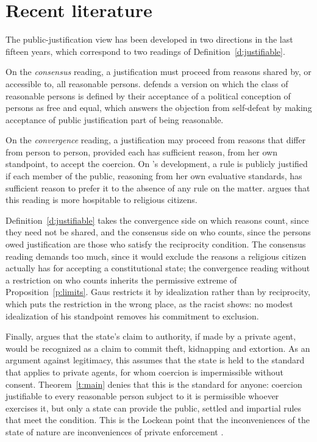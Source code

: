\documentclass{situationist-preprint}
\begin{document}
\section{Recent literature}

The public-justification view has been developed in two directions in the last fifteen years, which correspond to two readings of Definition~\ref{d:justifiable}.

On the \emph{consensus} reading, a justification must proceed from reasons shared by, or accessible to, all reasonable persons. \citet{Quong2011} defends a version on which the class of reasonable persons is defined by their acceptance of a political conception of persons as free and equal, which answers the objection from self-defeat by making acceptance of public justification part of being reasonable.

On the \emph{convergence} reading, a justification may proceed from reasons that differ from person to person, provided each has sufficient reason, from her own standpoint, to accept the coercion. On \citet{Gaus2011}'s development, a rule is publicly justified if each member of the public, reasoning from her own evaluative standards, has sufficient reason to prefer it to the absence of any rule on the matter. \citet{Vallier2014} argues that this reading is more hospitable to religious citizens.

Definition~\ref{d:justifiable} takes the convergence side on which reasons count, since they need not be shared, and the consensus side on who counts, since the persons owed justification are those who satisfy the reciprocity condition. The consensus reading demands too much, since it would exclude the reasons a religious citizen actually has for accepting a constitutional state; the convergence reading without a restriction on who counts inherits the permissive extreme of Proposition~\ref{p:limits}. Gaus restricts it by idealization rather than by reciprocity, which puts the restriction in the wrong place, as the racist shows: no modest idealization of his standpoint removes his commitment to exclusion.

Finally, \citet{Huemer2013} argues that the state's claim to authority, if made by a private agent, would be recognized as a claim to commit theft, kidnapping and extortion. As an argument against legitimacy, this assumes that the state is held to the standard that applies to private agents, for whom coercion is impermissible without consent. Theorem~\ref{t:main} denies that this is the standard for anyone: coercion justifiable to every reasonable person subject to it is permissible whoever exercises it, but only a state can provide the public, settled and impartial rules that meet the condition. This is the Lockean point that the inconveniences of the state of nature are inconveniences of private enforcement \citep[\S\S 124--126]{Locke1689}.
\end{document}
